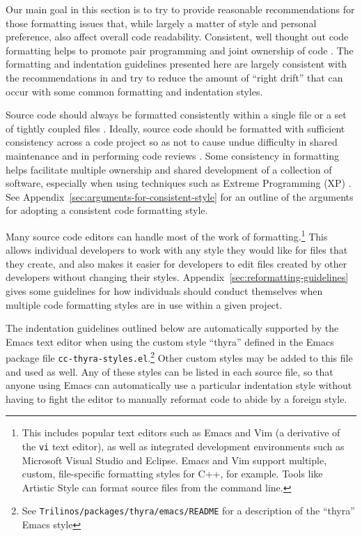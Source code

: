 Our main goal in this section is to try to provide reasonable
recommendations for those formatting issues that, while largely a
matter of style and personal preference, also affect overall code
readability.  Consistent, well thought out code formatting helps to
promote pair programming and joint ownership of code
{}\cite{ExtremeProgrammingExplained99}.  The formatting and
indentation guidelines presented here are largely consistent with the
recommendations in {}\cite[Chapter 31]{CodeComplete2nd04} and try to
reduce the amount of ``right drift'' that can occur with some common
formatting and indentation styles.

Source code should always be formatted consistently within a single
file or a set of tightly coupled files \cite[Item
0]{C++CodingStandards05}.  Ideally, source code should be formatted
with sufficient consistency across a code project so as not to cause
undue difficulty in shared maintenance and in performing code reviews
\cite{CodeComplete2nd04}.  Some consistency in formatting helps
facilitate multiple ownership and shared development of a collection
of software, especially when using techniques such as Extreme
Programming (XP) \cite{ExtremeProgrammingExplained99}.  See
Appendix~\ref{sec:arguments-for-consistent-style} for an outline of
the arguments for adopting a consistent code formatting style.

Many source code editors can handle most of the work of
formatting.\footnote{This includes popular text editors such as Emacs
  and Vim (a derivative of the \texttt{vi} text editor), as well as
  integrated development environments such as Microsoft Visual Studio
  and Eclipse.  Emacs and Vim support multiple, custom, file-specific
  formatting styles for C++, for example.  Tools like Artistic Style
  \cite{ArtisticStyle} can format source files from the command line.}
This allows individual developers to work with any style they would
like for files that they create, and also makes it easier for
developers to edit files created by other developers without changing
their styles.  Appendix~\ref{sec:reformatting-guidelines} gives some
guidelines for how individuals should conduct themselves when multiple
code formatting styles are in use within a given project.

The indentation guidelines outlined below are automatically supported
by the Emacs text editor when using the custom style ``thyra'' defined
in the Emacs package file \texttt{cc-thyra-styles.el}.\footnote{See
  \texttt{Trilinos/packages/thyra/emacs/README} for a description of
  the ``thyra'' Emacs style} Other custom styles may be added to this
file and used as well.  Any of these styles can be listed in each
source file, so that anyone using Emacs can automatically use a
particular indentation style without having to fight the editor to
manually reformat code to abide by a foreign style.


